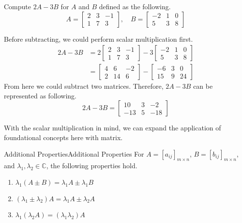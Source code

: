 \documentclass[../main.tex]{subfiles}
\begin{document}
\begin{problem}
Compute $2A - 3B$ for $A$ and $B$ defined as the following.
\[
A =
\begin{bmatrix}
    2 & 3 & -1 \\
    1 & 7 & 3
\end{bmatrix},
\quad
B =
\begin{bmatrix}
    -2 & 1 & 0 \\
    5  & 3 & 8
\end{bmatrix}
\]
\end{problem}
\begin{solution}
Before subtracting, we could perform scalar multiplication first.
\begin{align*}
2A - 3B
&=
2\begin{bmatrix}
    2 & 3 & -1 \\
    1 & 7 & 3
\end{bmatrix}
-
3\begin{bmatrix}
    -2 & 1 & 0 \\
    5  & 3 & 8
\end{bmatrix} \\
&=
\begin{bmatrix}
    4 & 6  & -2 \\
    2 & 14 & 6
\end{bmatrix}
-
\begin{bmatrix}
    -6 & 3 & 0 \\
    15 & 9 & 24
\end{bmatrix}
\end{align*}
From here we could subtract two matrices. Therefore, $2A - 3B$
can be represented as following.
\[
2A - 3B =
\begin{bmatrix}
    10  & 3  & -2 \\
    -13 & 5 & -18
\end{bmatrix}
\]
\end{solution}

With the scalar multiplication in mind, we can expand the application
of foundational concepts here with matrix.

\begin{theorem}{Additional Properties}{Additional Properties}
For $A = [a_{ij}]_{m \times n}$, $B = [b_{ij}]_{m \times n}$,
and $\lambda_1, \lambda_2 \in \mathbb{C}$, the following
properties hold.
\begin{enumerate}
\item $\lambda_1 (A \pm B) = \lambda_1 A \pm \lambda_1 B$
\item $(\lambda_1 \pm \lambda_2) A = \lambda_1 A \pm \lambda_2 A$
\item $\lambda_1 (\lambda_2 A) = (\lambda_1 \lambda_2) A$
\end{enumerate}
\end{theorem}
\end{document}
